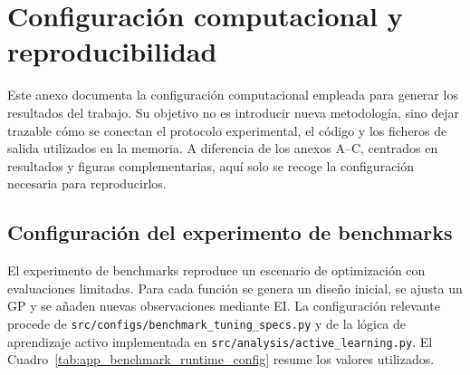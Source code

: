 \chapter{Configuración computacional y reproducibilidad}
\label{app:configuracion_reproducibilidad}

Este anexo documenta la configuración computacional empleada para generar los resultados del trabajo. Su objetivo no es introducir nueva metodología, sino dejar trazable cómo se conectan el protocolo experimental, el código y los ficheros de salida utilizados en la memoria. A diferencia de los anexos A--C, centrados en resultados y figuras complementarias, aquí solo se recoge la configuración necesaria para reproducirlos.

\section{Configuración del experimento de benchmarks}
\label{app:configuracion_computacional_benchmarks}

El experimento de benchmarks reproduce un escenario de optimización con evaluaciones limitadas. Para cada función se genera un diseño inicial, se ajusta un GP y se añaden nuevas observaciones mediante EI. La configuración relevante procede de \texttt{src/configs/benchmark\_tuning\_specs.py} y de la lógica de aprendizaje activo implementada en \texttt{src/analysis/active\_learning.py}. El Cuadro~\ref{tab:app_benchmark_runtime_config} resume los valores utilizados.

